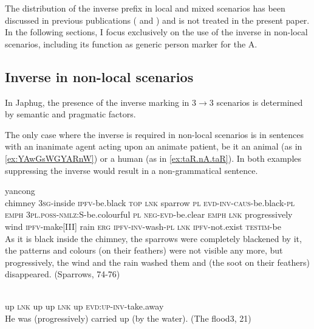 The distribution of the inverse prefix in local and mixed scenarios has been discussed in previous publications (\citealt{jacques10inverse} and \citealt{jacques14inverse}) and is not treated in the present paper. In the following sections, I focus exclusively on the use of the inverse in non-local scenarios, including its function as generic person marker for the A.

\subsection{Inverse in non-local scenarios} \label{sec:obv.jpg}
In Japhug, the presence of the inverse marking in  3$\rightarrow$3 scenarios is determined by semantic and pragmatic factors. 

The only case where the inverse is required in non-local scenarios is in sentences with an inanimate agent acting upon an animate patient, be it an animal (as in \ref{ex:YAwGsWGYARnW}) or a human (as in \ref{ex:taR.nA.taR}). In both examples suppressing the inverse would result in a non-grammatical sentence.  
 

 \begin{exe}
\ex \label{ex:YAwGsWGYARnW} 
\gll
yancong	 	 	 	 	 	 	 	 	 	 	 	 	 	 	 	 	 	 	 	 	 	 \\
chimney \textsc{3sg}-inside \textsc{ipfv}-be.black \textsc{top} \textsc{lnk} sparrow \textsc{pl} \textsc{evd-inv-caus}-be.black-\textsc{pl} \textsc{emph} \textsc{3pl.poss-nmlz}:S-be.colourful \textsc{pl} \textsc{neg-evd}-be.clear \textsc{emph} \textsc{lnk} progressively wind \textsc{ipfv}-make[III] rain \textsc{erg} \textsc{ipfv-inv}-wash-\textsc{pl} \textsc{lnk} \textsc{ipfv}-not.exist \textsc{testim}-be \\
\glt As it is black inside the chimney, the sparrows were completely blackened by it, the patterns and colours (on their feathers) were not visible any more, but progressively, the wind and the rain washed them and (the soot on their feathers) disappeared.
 (Sparrows, 74-76)
\end{exe}

 \begin{exe}
\ex \label{ex:taR.nA.taR} 
\gll
{}   	   	   	   	   	   	   \\
up \textsc{lnk} up up \textsc{lnk} up \textsc{evd:up-inv-}take.away \\
\glt He was (progressively)  carried up (by the water). (The flood3, 21)
\end{exe}

